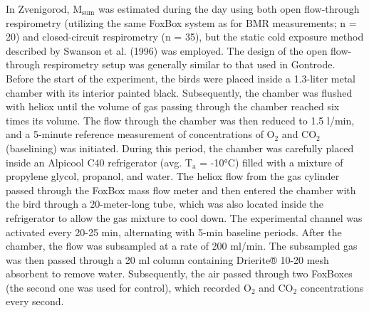 \documentclass[10pt, twoside]{book} %
\begin{document}
In Zvenigorod, M$_{\text{sum}}$ was estimated during the day using both open flow-through respirometry (utilizing the same FoxBox system as for BMR measurements; n = 20) and closed-circuit respirometry (n = 35), but the static cold exposure method described by Swanson et al. (1996) was employed. The design of the open flow-through respirometry setup was generally similar to that used in Gontrode. Before the start of the experiment, the birds were placed inside a 1.3-liter metal chamber with its interior painted black. Subsequently, the chamber was flushed with heliox until the volume of gas passing through the chamber reached six times its volume. The flow through the chamber was then reduced to 1.5 l/min, and a 5-minute reference measurement of concentrations of O$_{\text{2}}$ and CO$_{\text{2}}$ (baselining) was initiated. During this period, the chamber was carefully placed inside an Alpicool C40 refrigerator (avg. T$_{\text{a}}$ = -10°C) filled with a mixture of propylene glycol, propanol, and water. The heliox flow from the gas cylinder passed through the FoxBox mass flow meter and then entered the chamber with the bird through a 20-meter-long tube, which was also located inside the refrigerator to allow the gas mixture to cool down. The experimental channel was activated every 20-25 min, alternating with 5-min baseline periods. After the chamber, the flow was subsampled at a rate of 200 ml/min. The subsampled gas was then passed through a 20 ml column containing Drierite® 10-20 mesh absorbent to remove water. Subsequently, the air passed through two FoxBoxes (the second one was used for control), which recorded O$_{\text{2}}$ and CO$_{\text{2}}$ concentrations every second.\\
\end{document}
